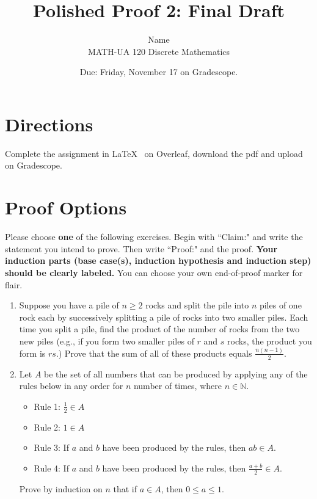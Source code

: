 \documentclass{article}
\title{Polished Proof 2: Final Draft}
\author{%
	Name
	\\
	MATH-UA 120 Discrete Mathematics
}
\date{Due: Friday, November 17 on Gradescope.}
\theoremstyle{definition}
\begin{document}
	\maketitle
	
	\section*{Directions}

Complete the assignment in \LaTeX~  on Overleaf, download the pdf and upload on Gradescope.


\section*{Proof Options}

Please choose \textbf{one} of the following exercises. Begin with ``Claim:" and write the statement you intend to prove. Then write ``Proof:" and the proof. \textbf{Your induction parts (base case(s), induction hypothesis and induction step) should be clearly labeled.} You can choose your own end-of-proof marker for flair.

\begin{enumerate}
	\item 
    Suppose you have a pile of $n\geq 2$ rocks and split the pile into $n$ piles of one rock each by successively splitting a pile of rocks into two smaller piles. Each time you split a pile, find the product of the number of rocks from the two new piles (e.g., if you form two smaller piles of $r$ and $s$ rocks, the product you form is $rs$.) Prove that the sum of all of these products equals $\frac{n(n-1)}{2}$.
	\item Let $A$ be the set of all numbers that can be produced by applying any of the rules below in any order for $n$ number of times, where $n\in \mathbb{N}$.
    \begin{itemize}
    \item Rule 1: $\frac{1}{2}\in A$
    \item Rule 2: $1\in A$
    \item Rule 3: If $a$ and $b$ have been produced by the rules, then $ab\in A$.
    \item Rule 4: If $a$ and $b$ have been produced by the rules, then $\frac{a+b}{2}\in A$.
    \end{itemize}
    Prove by induction on $n$ that if $a\in A$, then $0\leq a\leq 1$.

\end{enumerate}
\end{document}
